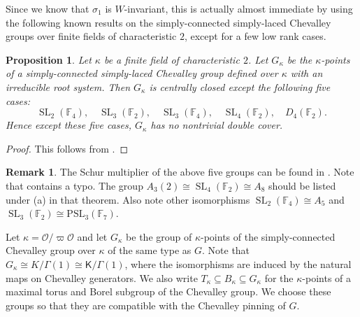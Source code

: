 \documentclass[10pt, letterpaper]{amsart}
\theoremstyle{plain}
\newtheorem{Prop}[equation]{Proposition}
\theoremstyle{definition}
\newtheorem*{Rmk}{Remark}
\numberwithin{equation}{section}
\newcommand{\SL}{\operatorname{SL}}
\newcommand{\Ocal}{\mathcal{O}}
\newcommand{\Kf}{\mathsf{K}}
\newcommand{\Gammaf}{\mathsf{\Gamma}}
\begin{document}
Since we know that $\sigma_1$ is $W$-invariant, this is actually almost immediate by using the following known results on the simply-connected simply-laced Chevalley groups over finite fields of characteristic $2$, except for a few low rank cases.
\begin{Prop}\label{SchurMult}
	Let $\kappa$ be a finite field of characteristic $2$. Let $G_\kappa$ be the $\kappa$-points of a simply-connected simply-laced Chevalley group defined over $\kappa$ with an irreducible root system. Then $G_\kappa$ is centrally closed except the following five cases:
\begin{equation}\label{E:exceptional_low_rank_cases}
\SL_{2}(\mathbb{F}_{4}),\quad \SL_{3}(\mathbb{F}_{2}),\quad \SL_{3}(\mathbb{F}_{4}),\quad \SL_{4}(\mathbb{F}_{2}),\quad D_{4}(\mathbb{F}_{2}). 
\end{equation}
Hence except these five cases, $G_\kappa$ has no nontrivial double cover. 
\end{Prop}
\begin{proof}
This follows from \cite[Corollary 2 and Remark (b), page 58]{S16}. 
\end{proof}

\begin{Rmk}
The Schur multiplier of the above five groups can be found in \cite{S81}. Note that \cite[Theorem 1.1]{S81} contains a typo. The group $A_{3}(2)\cong \SL_{4}(\mathbb{F}_{2})\cong A_{8}$ should be listed under (a) in that theorem. Also note other isomorphisms $\SL_{2}(\mathbb{F}_{4})\cong A_{5}$ and $\SL_{3}(\mathbb{F}_{2})\cong \mathrm{PSL}_{3}(\mathbb{F}_{7})$.
\end{Rmk}

Let $\kappa=\Ocal/\varpi\Ocal$ and let $G_{\kappa}$ be the group of $\kappa$-points of the simply-connected Chevalley group over $\kappa$ of the same type as $G$. Note that $G_{\kappa}\cong K/\Gamma(1)\cong{\Kf}/{\Gammaf}(1)$, where the isomorphisms are induced by the natural maps on Chevalley generators. We also write $T_{\kappa}\subseteq B_{\kappa}\subseteq G_{\kappa}$ for the $\kappa$-points of a maximal torus and Borel subgroup of the Chevalley group. We choose these groups so that they are compatible with the Chevalley pinning of $G$.
\end{document}
